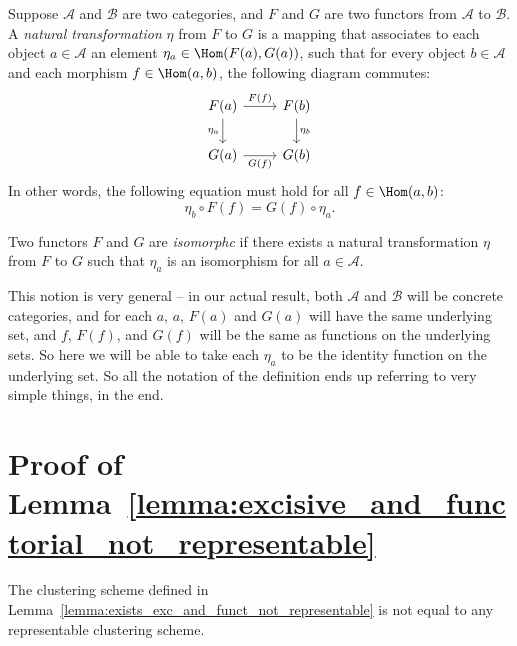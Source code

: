 \documentclass[a4paper,reqno,oneside]{article} %
\begin{document}
\begin{definition}
    Suppose $\mathcal{A}$ and $\mathcal{B}$ are two categories, and $F$ and $G$ are two functors from $\mathcal{A}$ to $\mathcal{B}$. A \emph{natural transformation} $\eta$ from $F$ to $G$ is a mapping that associates to each object $a \in \mathcal{A}$ an element $\eta_a \in \Hom(F(a), G(a))$, such that for every object $b \in \mathcal{A}$ and each morphism $f \in \Hom(a, b)$, the following diagram commutes:
    $$\begin{tikzcd}
        F(a) \arrow[r, "F(f)"] \arrow[d, "\eta_a"'] & F(b) \arrow[d, "\eta_b"]\\
        G(a) \arrow[r, "G(f)"'] & G(b)
    \end{tikzcd}$$
    In other words, the following equation must hold for all $f \in \Hom(a,b)$:
    $$\eta_b \circ F(f) = G(f) \circ \eta_a.$$

    Two functors $F$ and $G$ are \emph{isomorphc} if there exists a natural transformation $\eta$ from $F$ to $G$ such that $\eta_a$ is an isomorphism for all $a \in \mathcal{A}$.
\end{definition}

This notion is very general -- in our actual result, both $\mathcal{A}$ and $\mathcal{B}$ will be concrete categories, and for each $a$, $a$, $F(a)$ and $G(a)$ will have the same underlying set, and $f$, $F(f)$, and $G(f)$ will be the same as functions on the underlying sets. So here we will be able to take each $\eta_a$ to be the identity function on the underlying set. So all the notation of the definition ends up referring to very simple things, in the end.

\section{Proof of Lemma~\ref{lemma:excisive_and_functorial_not_representable}}\label{excisive_and_functorial_not_representable_appendix}

\begin{lemma}\label{lemma:excisive_and_functorial_not_representable}
    The clustering scheme defined in Lemma~\ref{lemma:exists_exc_and_funct_not_representable} is not equal to any representable clustering scheme.
\end{lemma}
\end{document}
